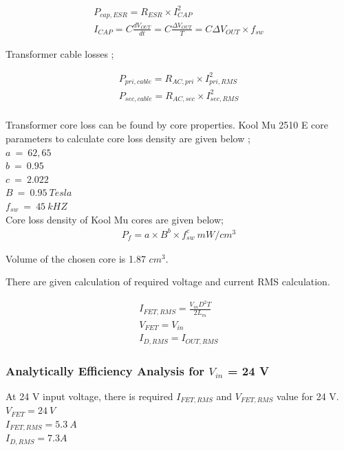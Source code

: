  \begin{align}
     P_{cap,ESR} = R_{ESR} \times I_{CAP}^2 \\
     I_{CAP} =  C \frac{dV_{OUT}}{dt} = C\frac{\Delta V_{OUT}}{T}= C \Delta V_{OUT} \times f_{sw} 
 \end{align}
 
 Transformer cable losses ;
 
 \begin{align}
     P_{pri,cable} = R_{AC,pri} \times I_{pri,RMS}^2 \\
     P_{sec,cable} = R_{AC,sec} \times I_{sec,RMS}^2 \\
 \end{align}
 
 Transformer core loss can be found by core properties. Kool Mu 2510 E core parameters to calculate core loss density are given below ;\\
 
$a\ =\ 62,65$\\
$b\ =\ 0.95$\\
$c\ =\ 2.022$\\
$B\ =\ 0.95\ Tesla$\\
$f_{sw}\ =\ 45\ kHZ$\\

Core loss density of Kool Mu cores are given below;
  \begin{align}
     P_f = a\times B^b \times f_{sw}^c\ mW/cm^3
 \end{align}
 
 Volume of the chosen core is 1.87 $cm^3$.  
 
 There are given calculation of required voltage and current RMS calculation.
 
 \begin{align}
    I_{FET,RMS} = \frac{V_{in} D^2 T}{2 L_m}\\
    V_{FET} = V_{in} \\
    I_{D,RMS} = I_{OUT,RMS} 
\end{align}
 
\subsubsection{Analytically Efficiency Analysis for $V_{in}$ = 24 V }

At 24 V input voltage, there is required $I_{FET,RMS}$ and $V_{FET,RMS}$ value for 24 V.\\

$V_{FET} = 24\ V$\\
$I_{FET,RMS}= 5.3\ A$\\
$I_{D,RMS} = 7.3 A $\\

